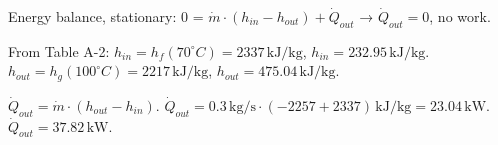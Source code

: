 Energy balance, stationary:  
0 = \( \dot{m} \cdot (h_{in} - h_{out}) + \dot{Q}_{out} \) → \( \dot{Q}_{out} = 0 \), no work.  

From Table A-2:  
\( h_{in} = h_f(70^\circ C) = 2337 \, \text{kJ/kg} \), \( h_{in} = 232.95 \, \text{kJ/kg} \).  
\( h_{out} = h_g(100^\circ C) = 2217 \, \text{kJ/kg} \), \( h_{out} = 475.04 \, \text{kJ/kg} \).  

\( \dot{Q}_{out} = \dot{m} \cdot (h_{out} - h_{in}) \).  
\( \dot{Q}_{out} = 0.3 \, \text{kg/s} \cdot (-2257 + 2337) \, \text{kJ/kg} = 23.04 \, \text{kW} \).  
\( \dot{Q}_{out} = 37.82 \, \text{kW} \).